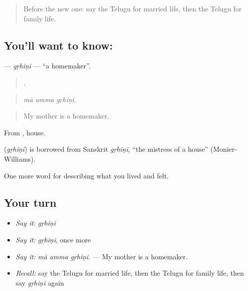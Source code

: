 \label{lesson:TE-C533-grhini}



\begin{quote}
Before the new one: say the Telugu for married life, then the Telugu for family life.
\end{quote}

\subsection*{You'll want to know: }
\textbf{} — \emph{gṛhiṇi} — \textquotedblleft{}a homemaker\textquotedblright{}.

\begin{quote}
  .
\end{quote}

\begin{quote}
\emph{mā amma gṛhiṇi.}
\end{quote}

\begin{quote}
My mother is a homemaker.
\end{quote}

From , house.

\begin{cousinweb}
\textbf{} (\emph{gṛhiṇi}) is borrowed from Sanskrit \emph{gṛhiṇī}, \textquotedblleft{}the mistress of a house\textquotedblright{} (Monier-Williams).
\end{cousinweb}

\begin{grammarlens}[title={What you've built}]
One more word for describing what you lived and felt.
\end{grammarlens}

\subsection*{Your turn}
\begin{itemize}
\raggedright
  \item \emph{Say it:} \emph{gṛhiṇi}
  \item \emph{Say it:} \emph{gṛhiṇi}, once more
  \item \emph{Say it:} \emph{mā amma gṛhiṇi.} — My mother is a homemaker.
  \item \emph{Recall:} say the Telugu for married life, then the Telugu for family life, then say \emph{gṛhiṇi} again
\end{itemize}

